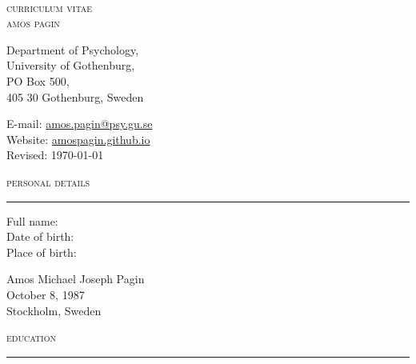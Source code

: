 \documentclass[11pt]{article}
\newcommand{\RR}{\textcolor{grayrule}{\rule[3mm]{\textwidth}{0.5pt}}}
\begin{document}
\thispagestyle{empty}
\begin{center}
\textsc{} \\[\baselineskip]
{\fontsize{18}{48} \selectfont \textsc{curriculum vitae}} \\[1.25\baselineskip]
{\fontsize{18}{48} \selectfont \textsc{amos pagin}} \vspace{1.35\baselineskip}
\end{center}

\normalsize 
\begin{minipage}[t]{0.7\linewidth}
Department of Psychology,  \\ 
University of Gothenburg, \\
  PO Box 500,  \\
 405 30 Gothenburg, Sweden\\
  \vspace{0.75\baselineskip}
 \end{minipage}
 \begin{minipage}[t]{0.5\linewidth}
 E-mail: \href{mailto: amos.pagin@psy.gu.se}{amos.pagin@psy.gu.se}\\
 Website: \href{https://amospagin.github.io}{amospagin.github.io} \\
 
 Revised: \today
 \end{minipage}

\textsc{\Large personal details}  \\
\vspace{-.3cm}\RR 

\begin{minipage}[t]{0.15\linewidth}
Full name: \\ 
Date of birth: \\ 
Place of birth: \\
\end{minipage}
\begin{minipage}[t]{0.9\linewidth}
Amos Michael Joseph Pagin\\
October 8, 1987 \\
Stockholm, Sweden \\

\end{minipage}


\textsc{\Large education}  \\
\vspace{-.3cm}\RR 
\end{document}
